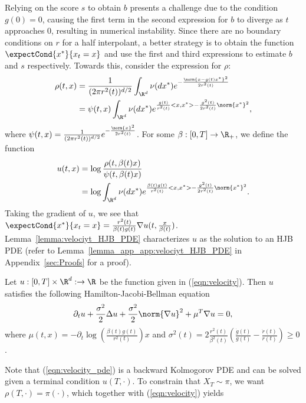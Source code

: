 Relying on the score $s$ to obtain $b$ presents a challenge due to the condition $g(0)=0$, causing the first term in the second expression for $b$ to diverge as $t$ approaches 0, resulting in numerical instability. Since there are no boundary conditions on $r$ for a half interpolant, a better strategy is to obtain the function $\expectCond{x^*}{x_t=x}$ and use the first and third expressions to estimate $b$ and $s$ respectively. Towards this, consider the expression for $\rho$:
\begin{align*}
    \rho(t,x) &= \frac{1}{(2\pi r^2(t))^{d/2}}\int_{\R^d}\nu(dx^*)e^{-\frac{\norm{x-g(t)x^*}^2}{2r^2(t)}}\\
    &= \psi(t,x)\int_{\R^d}\nu(dx^*)e^{\frac{g(t)}{r^2(t)}<x,x^*>-\frac{g^2(t)}{2r^2(t)}\norm{x^*}^2},
\end{align*}
where $\psi(t,x)=\frac{1}{(2\pi r^2(t))^{d/2}}e^{-\frac{\norm{x}^2}{2r^2(t)}}$. For some $\beta:[0,T]\rightarrow\R_+$, we define the function
\begin{align}\label{eqn:velocity}
\begin{split}
    u(t,x) &= \log\frac{\rho(t,\beta(t)x)}{\psi(t,\beta(t)x)}\\
    &= \log\int_{\R^d}\nu(dx^*)e^{\frac{\beta(t)g(t)}{r^2(t)}<x,x^*>-\frac{g^2(t)}{2r^2(t)}\norm{x^*}^2}.
\end{split}
\end{align}
Taking the gradient of $u$, we see that $\expectCond{x^*}{x_t=x} = \frac{r^2(t)}{\beta(t)g(t)}\nabla u(t,\frac{x}{\beta(t)})$.
Lemma~\ref{lemma:velociyt_HJB_PDE} characterizes $u$ as the solution to an HJB PDE (refer to Lemma~\ref{lemma_app_app:velociyt_HJB_PDE} in Appendix~\ref{sec:Proofs} for a proof).
\begin{lemma}\label{lemma:velociyt_HJB_PDE}
    Let $u:[0,T]\times\R^d:\rightarrow\R$ be the function given in (\ref{eqn:velocity}). Then $u$ satisfies the following Hamilton-Jacobi-Bellman equation
\begin{equation}\label{eqn:velocity_pde}
    \partial_t u + \frac{\sigma^2}{2}\Delta u + \frac{\sigma^2}{2}\norm{\nabla u}^2 + \mu^T\nabla u = 0,
\end{equation}
where $\mu(t,x) = -\partial_t\log\left(\frac{\beta(t)g(t)}{r^2(t)}\right)x$ and $\sigma^2(t) = 2\frac{r^2(t)}{\beta^2(t)}\left(\frac{\dot g(t)}{g(t)}-\frac{\dot r(t)}{r(t)}\right)\geq 0$. 
\end{lemma}
Note that (\ref{eqn:velocity_pde}) is a backward Kolmogorov PDE and can be solved given a terminal condition $u(T,\cdot)$. To constrain that $X_T\sim\pi$, we want $\rho(T,\cdot)=\pi(\cdot)$, which together with (\ref{eqn:velocity}) yields
